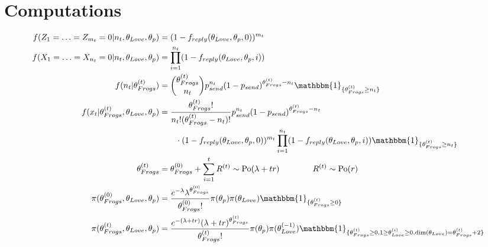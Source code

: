 \documentclass[10pt, a4paper]{article}
\begin{document}
    \section{Computations}
    \begin{align*}
        f(Z_1 = \ldots = Z_{m_t} = 0|n_t, \theta_{Love}, \theta_p)
        &= (1-f_{reply}(\theta_{Love}, \theta_{p}, 0))^{m_t} \\
        f(X_1 = \ldots = X_{n_t} = 0|n_t, \theta_{Love}, \theta_p)
        &= \prod_{i=1}^{n_t} (1-f_{reply}(\theta_{Love}, \theta_{p}, i)) \\
        f(n_t|\theta_{Frogs}^{(t)}) 
        &= \binom{\theta_{Frogs}^{(t)}}{n_t}p_{send}^{n_t}(1-p_{send})^{\theta_{Frogs}^{(t)}-n_t} \mathbbm{1}_{\{\theta_{Frogs}^{(t)}\geq n_t\}} \\
        f(x_t|\theta_{Frogs}^{(t)}, \theta_{Love}, \theta_p)
        &= \frac{\theta_{Frogs}^{(t)}!}{n_t!(\theta_{Frogs}^{(t)}-n_t)!}p_{send}^{n_t}(1-p_{send})^{\theta_{Frogs}^{(t)}-n_t} \\&\qquad\cdot(1-f_{reply}(\theta_{Love}, \theta_{p}, 0))^{m_t}\prod_{i=1}^{n_t} (1-f_{reply}(\theta_{Love}, \theta_{p}, i)) \mathbbm{1}_{\{\theta_{Frogs}^{(t)}\geq n_t\}} \\
        \theta_{Frogs}^{(t)} 
        &= \theta_{Frogs}^{(0)} + \sum_{i=1}^{t} R^{(t)} \sim \mathrm{Po}(\lambda+tr) \qquad\qquad R^{(t)} \sim \mathrm{Po}(r) \\
        \pi(\theta_{Frogs}^{(0)}, \theta_{Love}, \theta_p)
        &= \frac{e^{-\lambda}\lambda^{\theta_{Frogs}^{(0)}}}{\theta_{Frogs}^{(0)}!}\pi(\theta_p)\pi(\theta_{Love}) \mathbbm{1}_{\{\theta_{Frogs}^{(t)} \geq 0\}} \\
        \pi(\theta_{Frogs}^{(t)}, \theta_{Love}, \theta_p)
        &= \frac{e^{-(\lambda+tr)}(\lambda+tr)^{\theta_{Frogs}^{(t)}}}{\theta_{Frogs}^{(t)}!}\pi(\theta_p)\pi(\theta_{Love}^{(-1)}) \mathbbm{1}_{\{\theta_{Frogs}^{(t)} \geq 0, 1\geq\theta_{Love}^{(i)}\geq 0, \dim(\theta_{Love}) = \theta_{Frogs}^{(t)}+2\}}
    \end{align*}
\end{document}
